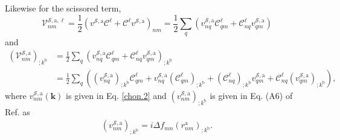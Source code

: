 Likewise for the scissored term,
\begin{equation}\label{a.3b}
\mathcal{V}^{{\mathcal{S}},\mathrm{a},\ell}_{nm}
= \frac{1}{2}\left(
  v^{{\mathcal{S}},\mathrm{a}}\mathcal{C}^{\ell}
+ \mathcal{C}^{\ell} v^{{\mathcal{S}},\mathrm{a}}
\right)_{nm}
= \frac{1}{2}\sum_{q}\left(  
  v^{{\mathcal{S}},\mathrm{a}}_{nq}\mathcal{C}^{\ell}_{qm}
+ \mathcal{C}^{\ell}_{nq}v^{{\mathcal{S}},\mathrm{a}}_{qm}
\right)
\end{equation}
and
\begin{align}\label{a.3c2}
\left(\mathcal{V}^{{\mathcal{S}},\mathrm{a}}_{nm}\right)_{;k^\mathrm{b}}
&=
\frac{1}{2}\sum_{q}\left(  
v^{{\mathcal{S}},\mathrm{a}}_{nq}\mathcal{C}^{\ell}_{qm}+\mathcal{C}^{\ell}_{nq} v^{{\mathcal{S}},\mathrm{a}}_{qm}
\right)_{;k^\mathrm{b}}\nonumber\\
&= \frac{1}{2}\sum_{q}\left(
  (v^{{\mathcal{S}},\mathrm{a}}_{nq})_{;k^\mathrm{b}}\mathcal{C}^{\ell}_{qm}
+ v^{{\mathcal{S}},\mathrm{a}}_{nq}(\mathcal{C}^{\ell}_{qm})_{;k^\mathrm{b}}
+ (\mathcal{C}^{\ell}_{nq})_{;k^\mathrm{b}} v^{{\mathcal{S}},\mathrm{a}}_{qm}
+ \mathcal{C}^{\ell}_{nq} (v^{{\mathcal{S}},\mathrm{a}}_{qm})_{;k^\mathrm{b}}
\right),
\end{align}   
where $v^{{\mathcal{S}},\mathrm{a}}_{nm}(\mathbf{k})$ is given in Eq.
\eqref{chon.2} and $(v^{{\mathcal{S}},\mathrm{a}}_{nm})_{;k^\mathrm{b}}$ is
given in Eq. (A6) of Ref. \cite{cabellosPRB09} as
\begin{align}\label{choni.1}
(v^{{\mathcal{S}},\mathrm{a}}_{nm})_{;k^\mathrm{b}} = 
i\Delta f_{mn}(r^\mathrm{a}_{nm})_{;k^\mathrm{b}}.
\end{align}

